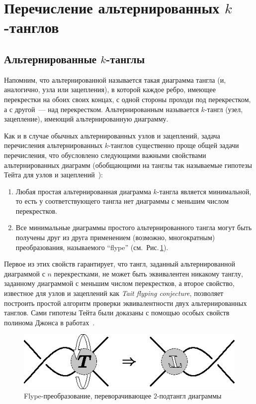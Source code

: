 \documentclass[12pt]{article}
\theoremstyle{plain}
\theoremstyle{definition}
\def\figureref#1{Рис.\,\protect\ref{#1}}
\begin{document}
	\newpage
	\section{Перечисление альтернированных $k$-танглов}
	\label{section:alternating}

	\subsection{Альтернированные $k$-танглы}

		Напомним, что альтернированной называется такая диаграмма тангла (и, аналогично, узла или зацепления), в которой каждое
		ребро, имеющее перекрестки на обоих своих концах, с одной стороны проходи под перекрестком, а с другой~--- над перекрестком.
		Альтернированным называется $k$-тангл (узел, зацепление), имеющий альтернированную диаграмму.

		Как и в случае обычных альтернированных узлов и зацеплений, задача перечисления альтернированных $k$-танглов существенно
		проще общей задачи перечисления, что обусловлено следующими важными свойствами альтернированных диаграмм (обобщающими
		на танглы так называемые гипотезы Тейта для узлов и зацеплений~\cite{Tait1900}):
		\begin{enumerate}
			\item
			Любая простая альтернированная диаграмма $k$-тангла является минимальной, то есть у соответствующего тангла
			нет диаграммы с меньшим числом перекрестков.

			\item
			Все минимальные диаграммы простого альтернированного тангла могут быть получены друг из
			друга применением (возможно, многократным) преобразования, называемого ``flype''
			(см.~\figureref{figure:flype}).
		\end{enumerate}

		Первое из этих свойств гарантирует, что тангл, заданный альтернированной диаграммой с $n$ перекрестками, не может быть
		эквивалентен никакому танглу, заданному диаграммой с меньшим числом перекрестков, а второе свойство, известное для
		узлов и зацеплений как \textit{Tait flyping conjecture}, позволяет построить простой алгоритм проверки эквивалентности
		двух альтернированных танглов. Сами гипотезы Тейта были доказаны с помощью особых свойств полинома Джонса в
		работах~\cite{Kauffman1987, Murasugi1987_1, Murasugi1987_2, Thistlethwaite1987, Thistlethwaite1988,
		MenascoThistlethwaite1991, MenascoThistlethwaite1993}.

		\begin{figure}[ht]
			\centering
			\includegraphics{c/flype.eps}
			\caption{\footnotesize Flype-преобразование, переворачивающее $2$-подтангл диаграммы\label{figure:flype}}
		\end{figure}
\end{document}
